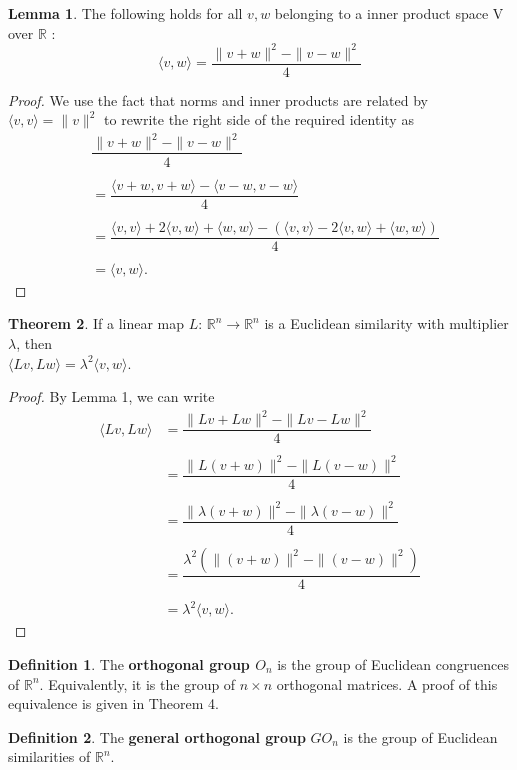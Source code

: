 \documentclass[11pt]{report}
\theoremstyle{plain}
\theoremstyle{definition}
\newtheorem{defn}{Definition}
\newtheorem{theorem}{Theorem}
\newtheorem{lemma}[theorem]{Lemma}
\newcommand\inner[2]{\langle #1, #2 \rangle}
\begin{document}
\begin{lemma}
	The following holds for all $ v,w $ belonging to a inner product space V over $ \mathbb{R}$ :
	$$ \inner{v}{w} = \dfrac{\|v + w\|^2 - \|v - w\|^2}{4}$$ 
\end{lemma}
\begin{proof}
	We use the fact that norms and inner products are related by $ \inner{v}{v} = \|v\| ^2 $ to rewrite the right side of the required identity as 
\begin{align*}
	& \dfrac{\|v + w\|^2 - \|v - w\|^2}{4}\\ \\ &= \dfrac{\inner{v+w}{v+w} - \inner{v-w}{v-w}}{4}\\ \\ 
	  &=\dfrac{\inner{v}{v} + 2\inner{v}{w} + \inner{w}{w} - (\inner{v}{v} - 2\inner{v}{w} + \inner{w}{w})}{4}\\ \\
	   &= \inner{v}{w}. 
\end{align*}
\end{proof}

\begin{theorem}
	If a linear map	$ L $:   $\mathbb{R}^n  \rightarrow  \mathbb{R}^n$ is a Euclidean similarity with multiplier $ \lambda $, then\\ $\inner{Lv}{Lw}= \lambda^2 \inner{v}{w} .$
\end{theorem}
\begin{proof}
	By Lemma 1, we can write
	\begin{align*} 
	 \inner{Lv}{Lw} &=  \dfrac{\|Lv + Lw\|^2 - \|Lv - Lw\|^2}{4} \\ \\ 
	 &=  \dfrac{\|L(v + w)\|^2 - \|L(v - w)\|^2}{4}\\ \\
	 &= \dfrac{\|\lambda(v + w)\|^2 - \|\lambda(v - w)\|^2}{4}\\ \\
	 &= \dfrac{\lambda^2(\|(v + w)\|^2 - \|(v - w)\|^2)}{4}\\ \\
	 &= \lambda^2 \inner{v}{w} .
	\end{align*}
	 
	
\end{proof}


\begin{defn}
	The \textbf{orthogonal group $ O_n $} is the group of Euclidean congruences of $ \mathbb{R}^n $. Equivalently, it is the group of $ n \times n  $ orthogonal matrices. A proof of this equivalence is given in Theorem 4. \\
\end{defn}	
\begin{defn}
	The \textbf{general orthogonal group} $ GO_n $ is the group of Euclidean similarities of $ \mathbb{R}^n $.\\
\end{defn}
\end{document}
